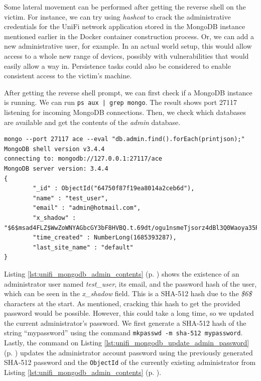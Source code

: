 Some lateral movement can be performed after getting the reverse shell on the victim. For instance, we can try using \textit{hashcat} to crack the administrative credentials for the UniFi network application stored in the MongoDB instance mentioned earlier in the Docker container construction process. Or, we can add a new administrative user, for example. In an actual world setup, this would allow access to a whole new range of devices, possibly with vulnerabilities that would easily allow a way in. Persistence tasks could also be considered to enable consistent access to the victim's machine.

After getting the reverse shell prompt, we can first check if a MongoDB instance is running. We can run \texttt{ps aux | grep mongo}. The result shows port 27117 listening for incoming MongoDB connections. Then, we check which databases are available and get the contents of the \textit{admin} database.

\begin{lstlisting}[caption=Fetching Contents of MongoDB Admin Collection.,numbers=none,label={lst:unifi_mongodb_admin_contents}]
mongo --port 27117 ace --eval "db.admin.find().forEach(printjson);"
MongoDB shell version v3.4.4
connecting to: mongodb://127.0.0.1:27117/ace
MongoDB server version: 3.4.4
{
        "_id" : ObjectId("64750f87f19ea8014a2ceb6d"),
        "name" : "test_user",
        "email" : "admin@hotmail.com",
        "x_shadow" : "$6$msad4FLZ$WwZoWNYAGbcGY3bF8HVBQ.t.69dt/ogu1nsmeTjsorz4dBl3Q0Waoya35R.Gm0qEgPoVsUorIhVRVpoiG8cFo/",
        "time_created" : NumberLong(1685393287),
        "last_site_name" : "default"
}
\end{lstlisting}

Listing \ref{lst:unifi_mongodb_admin_contents} (p. \pageref{lst:unifi_mongodb_admin_contents}) shows the existence of an administrator user named \textit{test\_user}, its email, and the password hash of the user, which can be seen in the \textit{x\_shadow} field. This is a SHA-512 hash due to the \textit{\$6\$} characters at the start. As mentioned, cracking this hash to get the provided password would be possible. However, this could take a long time, so we updated the current administrator's password. We first generate a SHA-512 hash of the string ``mypassword'' using the command \texttt{mkpasswd -m sha-512 mypassword}. Lastly, the command on Listing \ref{lst:unifi_mongodb_update_admin_password} (p. \pageref{lst:unifi_mongodb_admin_contents}) updates the administrator account password using the previously generated SHA-512 password and the \texttt{ObjectId} of the currently existing administrator from Listing \ref{lst:unifi_mongodb_admin_contents} (p. \pageref{lst:unifi_mongodb_admin_contents}).

